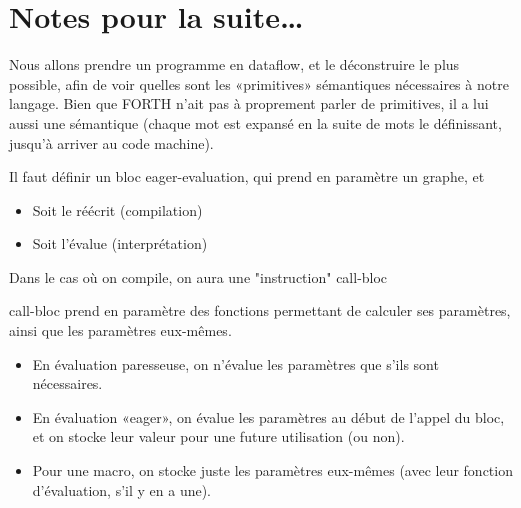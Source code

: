 \documentclass{article}
\begin{document}
\section{Notes pour la suite\dots}




Nous allons prendre un programme en dataflow, et le déconstruire le plus possible, afin de voir quelles sont les «primitives» sémantiques nécessaires à notre langage. Bien que FORTH n'ait pas à proprement parler de primitives, il a lui aussi une sémantique (chaque mot est expansé en la suite de mots le définissant, jusqu'à arriver au code machine).
  

Il faut définir un bloc eager-evaluation, qui prend en paramètre un graphe, et
\begin{itemize}
\item Soit le réécrit (compilation)
\item Soit l'évalue (interprétation)
\end{itemize}
Dans le cas où on compile, on aura une "instruction" call-bloc

call-bloc prend en paramètre des fonctions permettant de calculer ses paramètres, ainsi que les paramètres eux-mêmes.
\begin{itemize}
\item En évaluation paresseuse, on n'évalue les paramètres que s'ils sont nécessaires.
\item En évaluation «eager», on évalue les paramètres au début de l'appel du bloc, et on stocke leur valeur pour une future utilisation (ou non).
\item Pour une macro, on stocke juste les paramètres eux-mêmes (avec leur fonction d'évaluation, s'il y en a une).
\end{itemize}

\appendix



\end{document}
